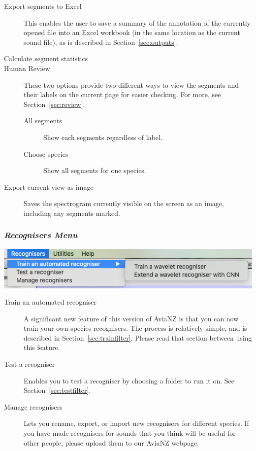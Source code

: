 \documentclass{article}
\begin{document}
\begin{description}
\item [Export segments to Excel] This enables the user to save a summary of the annotation of the currently opened file into an Excel workbook (in the same location as the current sound file), as is described in Section~\ref{sec:outputs}. 
\item [Calculate segment statistics]
\item [Human Review] These two options provide two different ways to view the segments and their labels on the current page for easier checking. For more, see Section~\ref{sec:review}.
\begin{description}
\item[All segments] Show each segments regardless of label.
\item[Choose species] Show all segments for one species.
\end{description}
\item [Export current view as image] Saves the spectrogram currently visible on the screen as an image, including any segments marked. 
\end{description}

\subsubsection{{\em Recognisers Menu}}

\begin{center}
\includegraphics[width=.3\textwidth]{Figures/RecognisersMenu}
\end{center}

\begin{description}
\item [Train an automated recogniser] A significant new feature of this version of AviaNZ is that you can now train your own species recognisers. The process is relatively simple, and is described in Section~\ref{sec:trainfilter}. Please read that section between using this feature.
\item [Test a recogniser] Enables you to test a recogniser by choosing a folder to run it on. See Section~\ref{sec:testfilter}.
\item[Manage recognisers] Lets you rename, export, or import new recognisers for different species. 
If you have made recognisers for sounds that you think will be useful for other people, please upload them to our AviaNZ webpage.   
\end{description}
\end{document}
